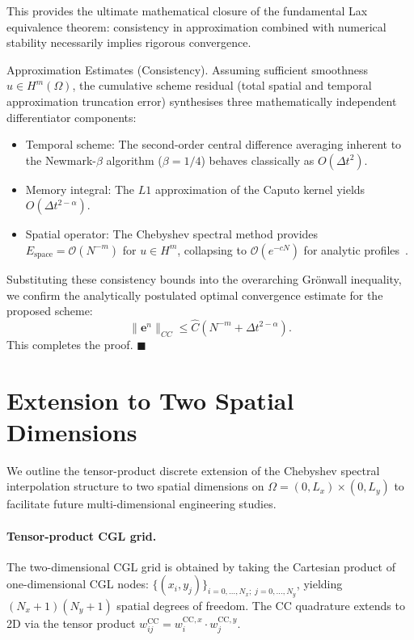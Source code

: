 \documentclass[a4paper,fleqn]{cas-sc}
\begin{document}
\begin{appendix}
This provides the ultimate mathematical closure of the fundamental Lax equivalence theorem: consistency in approximation combined with numerical stability necessarily implies rigorous convergence.

Approximation Estimates (Consistency). 
Assuming sufficient smoothness $u \in H^m(\Omega)$, the cumulative scheme residual (total spatial and temporal approximation truncation error) synthesises three mathematically independent differentiator components:
\begin{itemize}
    \item Temporal scheme: The second-order central difference averaging inherent to the Newmark-$\beta$ algorithm ($\beta=1/4$) behaves classically as $O(\Delta t^2)$.
    \item Memory integral: The $L1$ approximation of the Caputo kernel yields $O(\Delta t^{2-\alpha})$.
    \item Spatial operator: The Chebyshev spectral method provides $E_{\mathrm{space}} = \mathcal{O}(N^{-m})$ for $u \in H^m$, collapsing to $\mathcal{O}(e^{-cN})$ for analytic profiles~\cite{ref5}.
\end{itemize}
Substituting these consistency bounds into the overarching Gr\"onwall inequality, we confirm the analytically postulated optimal convergence estimate for the proposed scheme:
\begin{equation}
\|\mathbf{e}^n\|_{CC} \le \hat{C} \left( N^{-m} + \Delta t^{2-\alpha} \right).
\end{equation}
This completes the proof.
\hfill $\blacksquare$

\section{Extension to Two Spatial Dimensions}\label{app:2d_extension}

We outline the tensor-product discrete extension of the Chebyshev spectral interpolation structure to two spatial dimensions on $\Omega = (0,L_x) \times (0,L_y)$ to facilitate future multi-dimensional engineering studies.

\paragraph{Tensor-product CGL grid.}
The two-dimensional CGL grid is obtained by taking the Cartesian product of one-dimensional CGL nodes: $\{(x_i, y_j)\}_{i=0,\ldots,N_x;\; j=0,\ldots,N_y}$, yielding $(N_x+1)(N_y+1)$ spatial degrees of freedom. The CC quadrature extends to 2D via the tensor product $w_{ij}^{\mathrm{CC}} = w_i^{\mathrm{CC},x} \cdot w_j^{\mathrm{CC},y}$.


\end{appendix}
\end{document}
